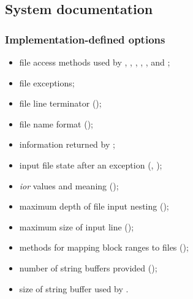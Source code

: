 \subsection{System documentation} %

\subsubsection{Implementation-defined options} %
\begin{itemize}
\item file access methods used by
	,
	,
	,
	,
	, and
	;
\item file exceptions;
\item file line terminator ();
\item file name format ();
\item information returned by ;
\item input file state after an exception
	(,
	 );
\item \emph{ior} values and meaning ();
\item maximum depth of file input nesting
	();
\item maximum size of input line ();
\item methods for mapping block ranges to files
	();
\item number of string buffers provided ();
\item size of string buffer used by .
\end{itemize}

